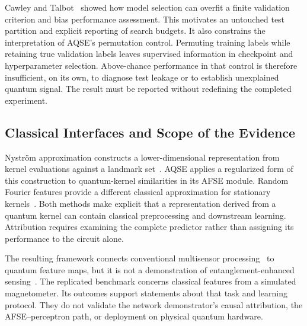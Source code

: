Cawley and Talbot~\cite{cawley2010selection} showed how model selection can overfit a finite validation criterion and bias performance assessment. This motivates an untouched test partition and explicit reporting of search budgets. It also constrains the interpretation of AQSE's permutation control. Permuting training labels while retaining true validation labels leaves supervised information in checkpoint and hyperparameter selection. Above-chance performance in that control is therefore insufficient, on its own, to diagnose test leakage or to establish unexplained quantum signal. The result must be reported without redefining the completed experiment.

\subsection{Classical Interfaces and Scope of the Evidence}

Nystr\"om approximation constructs a lower-dimensional representation from kernel evaluations against a landmark set~\cite{williams2001nystrom}. AQSE applies a regularized form of this construction to quantum-kernel similarities in its AFSE module. Random Fourier features provide a different classical approximation for stationary kernels~\cite{rahimi2007random}. Both methods make explicit that a representation derived from a quantum kernel can contain classical preprocessing and downstream learning. Attribution requires examining the complete predictor rather than assigning its performance to the circuit alone.

The resulting framework connects conventional multisensor processing~\cite{hall1997fusion} to quantum feature maps, but it is not a demonstration of entanglement-enhanced sensing~\cite{degen2017sensing}. The replicated benchmark concerns classical features from a simulated magnetometer. Its outcomes support statements about that task and learning protocol. They do not validate the network demonstrator's causal attribution, the AFSE--perceptron path, or deployment on physical quantum hardware.
